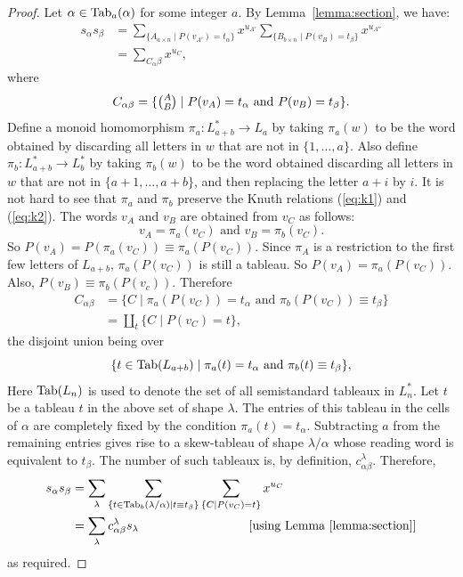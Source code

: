 \documentclass[11pt]{amsproc}
\theoremstyle{definition}
\theoremstyle{example}
\newcommand{\Tab}{\textup{Tab}}
\begin{document}
\begin{proof}
  Let $\alpha\in \Tab_a(\alpha)$ for some integer $a$.
  By Lemma~\ref{lemma:section}, we have:
  \begin{align}
    \nonumber s_\alpha s_\beta & = \sum_{\{A_{a\times n}\mid P(v_{A'}) = t_\alpha\}} x^{u_{A'}} \sum_{\{B_{b\times n}\mid P(v_B) = t_\beta\}} x^{u_{A''}}\\
    \label{eq:sum-C} & = \sum_{C_\alpha\beta} x^{u_C},
  \end{align}
  where
  \begin{displaymath}
    C_{\alpha\beta} = \{\tbinom AB\mid P(v_A)=t_\alpha\text{ and } P(v_B)=t_\beta\}.
  \end{displaymath}
  Define a monoid homomorphism $\pi_a:L_{a+b}^*\to L_a$ by taking $\pi_a(w)$ to be the word obtained by discarding all letters in $w$ that are not in $\{1,\dotsc,a\}$.
  Also define $\pi_b:L_{a+b}^*\to L_b^*$ by taking $\pi_b(w)$ to be the word obtained discarding all letters in $w$ that are not in $\{a+1,\dotsc, a+b\}$, and then replacing the letter $a+i$ by $i$.
  It is not hard to see that $\pi_a$ and $\pi_b$ preserve the Knuth relations (\ref{eq:k1}) and (\ref{eq:k2}).
  The words $v_A$ and $v_B$ are obtained from $v_C$ as follows:
  \begin{displaymath}
    v_A = \pi_a(v_C) \text{ and } v_B = \pi_b(v_C).
  \end{displaymath}
  So $P(v_A) = P(\pi_a(v_C)) \equiv \pi_a(P(v_C))$.
  Since $\pi_A$ is a restriction to the first few letters of $L_{a+b}$, $\pi_a(P(v_C))$ is still a tableau.
  So $P(v_A) = \pi_a(P(v_C))$.
  Also, $P(v_B) \equiv \pi_b(P(v_c))$.
  Therefore
  \begin{align*}
    C_{\alpha\beta} & = \{C \mid \pi_a(P(v_C)) = t_\alpha \text{ and } \pi_b(P(v_C))\equiv  t_\beta\}\\
    & = \coprod_t \{C\mid P(v_C)=t\},
  \end{align*}
  the disjoint union being over
  \begin{displaymath}
    \{t\in \Tab(L_{a+b})\mid \pi_a(t)=t_\alpha \text{ and } \pi_b(t)\equiv t_\beta\},
  \end{displaymath}
  Here $\Tab(L_n)$ is used to denote the set of all semistandard tableaux in $L_n^*$.
  Let $t$ be a tableau $t$ in the above set of shape $\lambda$.
  The entries of this tableau in the cells of $\alpha$ are completely fixed by the condition $\pi_a(t)=t_\alpha$.
  Subtracting $a$ from the remaining entries gives rise to a skew-tableau of shape $\lambda/\alpha$ whose reading word is equivalent to $t_\beta$.
  The number of such tableaux is, by definition, $c^\lambda_{\alpha\beta}$. Therefore,
  \begin{align*}
    s_\alpha s_\beta &= \sum_\lambda \sum_{\{t\in \Tab_b(\lambda/\alpha)\mid t\equiv t_\beta\}} \sum_{\{C\mid P(v_C)=t\}} x^{u_C}\\
    &=\sum_\lambda c^\lambda_{\alpha\beta} s_\lambda \hspace{3cm}\text{ [using Lemma~\ref{lemma:section}]}
  \end{align*}
  as required.
\end{proof}
\end{document}
